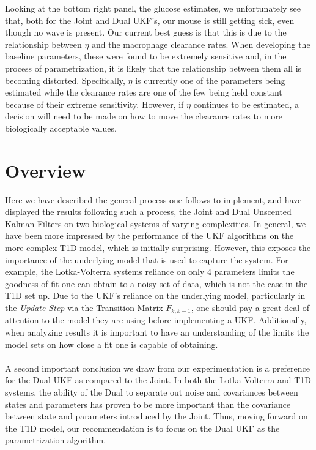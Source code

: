 Looking at the bottom right panel, the glucose estimates, we unfortunately see that, both for the Joint and Dual UKF's, our mouse is still getting sick, even though no wave is present. Our current best guess is that this is due to the relationship between $\eta$ and the macrophage clearance rates. When developing the baseline parameters, these were found to be extremely sensitive and, in the process of parametrization, it is likely that the relationship between them all is becoming distorted. Specifically, $\eta$ is currently one of the parameters being estimated while the clearance rates are one of the few being held constant because of their extreme sensitivity. However, if $\eta$ continues to be estimated, a decision will need to be made on how to move the clearance rates to more biologically acceptable values.

\section{Overview}
Here we have described the general process one follows to implement, and have displayed the results following such a process, the Joint and Dual Unscented Kalman Filters on two biological systems of varying complexities. In general, we have been more impressed by the performance of the UKF algorithms on the more complex T1D model, which is initially surprising. However, this exposes the importance of the underlying model that is used to capture the system. For example, the Lotka-Volterra systems reliance on only 4 parameters limits the goodness of fit one can obtain to a noisy set of data, which is not the case in the T1D set up. Due to the UKF's reliance on the underlying model, particularly in the \emph{Update Step} via the Transition Matrix $F_{k,k-1}$, one should pay a great deal of attention to the model they are using before implementing a UKF. Additionally, when analyzing results it is important to have an understanding of the limits the model sets on how close a fit one is capable of obtaining.\\
\\
A second important conclusion we draw from our experimentation is a preference for the Dual UKF as compared to the Joint. In both the Lotka-Volterra and T1D systems, the ability of the Dual to separate out noise and covariances between states and parameters has proven to be more important than the covariance between state and parameters introduced by the Joint. Thus, moving forward on the T1D model, our recommendation is to focus on the Dual UKF as the parametrization algorithm.